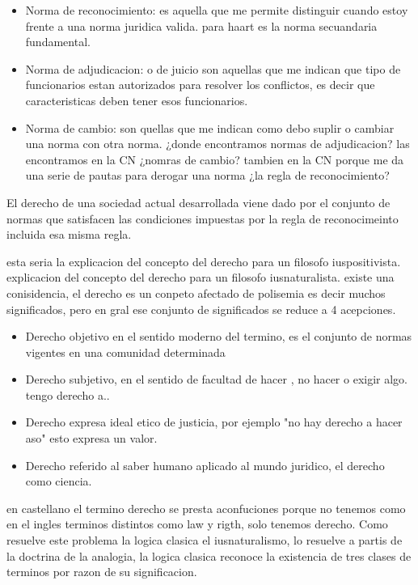 \documentclass[12pt]{book}
\begin{document}
\begin{itemize}
\item Norma de reconocimiento: es aquella que me permite distinguir cuando estoy frente a una norma juridica valida. para haart es la norma secuandaria fundamental.
\item Norma de adjudicacion: o de juicio son aquellas que me indican que tipo de funcionarios estan autorizados para resolver los conflictos, es decir que caracteristicas deben tener esos funcionarios.
\item Norma de cambio: son quellas que me indican como debo suplir o cambiar una norma con otra norma.
¿donde encontramos normas de adjudicacion? las encontramos en la CN
¿nomras de cambio? tambien en la CN porque me da una serie de pautas para derogar una norma 
¿la regla de reconocimiento?
\end{itemize}

El derecho de una sociedad actual desarrollada viene dado por el conjunto de normas que satisfacen las condiciones impuestas por la regla de reconocimeinto incluida esa misma regla.

esta seria la explicacion del concepto del derecho para un filosofo iuspositivista.
\\
explicacion del concepto del derecho para un filosofo iusnaturalista.
existe una conisidencia, el derecho es un conpeto afectado de polisemia es decir muchos significados,
pero en gral ese conjunto de significados se reduce a 4 acepciones. 
\begin{itemize}
\item Derecho objetivo en el sentido moderno del termino, es el conjunto de normas vigentes en una comunidad determinada
\item Derecho subjetivo, en el sentido de facultad de hacer , no hacer o exigir algo. tengo derecho a..
\item Derecho expresa ideal etico de justicia, por ejemplo "no hay derecho a hacer aso" esto expresa un valor.
\item Derecho referido al saber humano aplicado al mundo juridico, el derecho como ciencia.
\end{itemize}

en castellano el termino derecho se presta aconfuciones porque no tenemos como en el ingles terminos distintos como law y rigth, solo tenemos derecho.
Como resuelve este problema la logica clasica el iusnaturalismo, lo resuelve a partis de la doctrina de la analogia, 
la logica clasica reconoce la existencia de tres clases de terminos por razon de su significacion.
\end{document}
